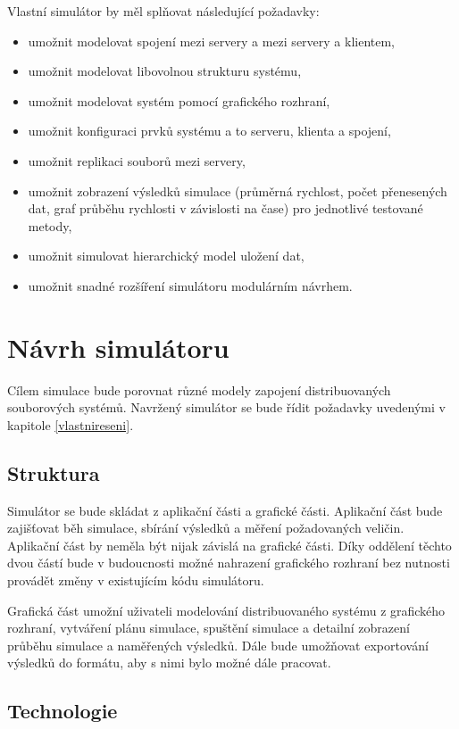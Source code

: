 \documentclass[czech,DP]{thesiskiv}
\begin{document}
Vlastní simulátor by měl splňovat následující požadavky:

\begin{itemize}
\item umožnit modelovat spojení mezi servery a mezi servery a klientem,
\item umožnit modelovat libovolnou strukturu systému,
\item umožnit modelovat systém pomocí grafického rozhraní,
\item umožnit konfiguraci prvků systému a to serveru, klienta a spojení,
\item umožnit replikaci souborů mezi servery,
\item umožnit zobrazení výsledků simulace (průměrná rychlost, počet přenesených dat, graf průběhu rychlosti v závislosti na čase) pro jednotlivé testované metody,
\item umožnit simulovat hierarchický model uložení dat,
\item umožnit snadné rozšíření simulátoru modulárním návrhem.

\end{itemize}

\chapter{Návrh simulátoru}

Cílem simulace bude porovnat různé modely zapojení distribuovaných souborových systémů. Navržený simulátor se bude řídit požadavky uvedenými v kapitole \ref{vlastnireseni}.

\section{Struktura}

Simulátor se bude skládat z aplikační části a grafické části. Aplikační část bude zajišťovat běh simulace, sbírání výsledků a měření požadovaných veličin. Aplikační část by neměla být nijak závislá na grafické části. Díky oddělení těchto dvou částí bude v budoucnosti možné nahrazení grafického rozhraní bez nutnosti provádět změny v existujícím kódu simulátoru.

Grafická část umožní uživateli modelování distribuovaného systému z grafického rozhraní, vytváření plánu simulace, spuštění simulace a detailní zobrazení průběhu simulace a naměřených výsledků. Dále bude umožňovat exportování výsledků do formátu, aby s nimi bylo možné dále pracovat.

\section{Technologie}
\end{document}

